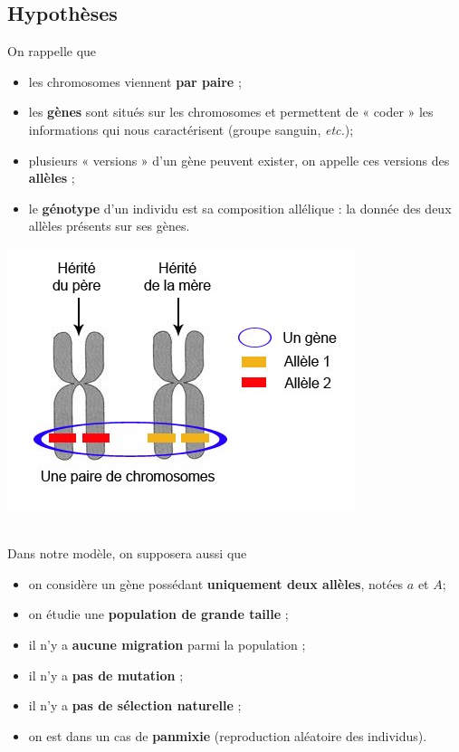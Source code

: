 \documentclass[11pt]{article}
\begin{document}
\subsection{Hypothèses}
\noindent\begin{minipage}{.5\textwidth}
  On rappelle que
  \begin{itemize}
    \item les chromosomes viennent \textbf{par paire} ;
    \item les \textbf{gènes} sont situés sur les chromosomes et permettent de «
      coder » les informations qui nous caractérisent (groupe sanguin,
      \emph{etc.});
    \item plusieurs « versions » d'un gène peuvent exister, on appelle ces
      versions des \textbf{allèles} ;
    \item le \textbf{génotype} d'un individu est sa composition allélique : la
      donnée des deux allèles présents sur ses gènes.
  \end{itemize}
\end{minipage}
\begin{minipage}{.5\textwidth}
\begin{center}
\includegraphics[scale=.5]{gene.jpg}
\end{center}
\end{minipage}\\[5mm]
Dans notre modèle, on supposera aussi que
\begin{itemize}
  \item on considère un gène possédant \textbf{uniquement deux allèles}, notées
    $a$ et $A$;
  \item on étudie une \textbf{population de grande taille} ;
  \item il n'y a \textbf{aucune migration} parmi la population ;
  \item il n'y a \textbf{pas de mutation} ;
  \item il n'y a \textbf{pas de sélection naturelle} ;
  \item on est dans un cas de \textbf{panmixie} (reproduction aléatoire des
    individus).
\end{itemize}
\end{document}
